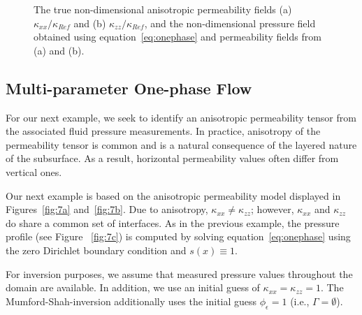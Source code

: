 \documentclass[manuscript,revised]{geophysics}
\begin{document}
{\begin{figure}
\caption{The true non-dimensional anisotropic permeability fields (a) $\kappa_{xx}/\kappa_{Ref}$ and (b) $\kappa_{zz}/\kappa_{Ref}$, and the non-dimensional pressure field obtained using equation~\ref{eq:onephase} and permeability fields from (a) and (b).}
\label{fig:7}
\end{figure}
}

\subsection{Multi-parameter One-phase Flow}
For our next example, we seek to identify an anisotropic permeability tensor from the associated fluid pressure measurements.  In practice, anisotropy of the permeability tensor is common and is a natural consequence of the layered nature of the subsurface.  As a result, horizontal permeability values often differ from vertical ones.

Our next example is based on the anisotropic permeability model displayed in Figures~\ref{fig:7a} and~\ref{fig:7b}.  Due to anisotropy, $\kappa_{xx} \neq \kappa_{zz}$; however, $\kappa_{xx}$ and $\kappa_{zz}$ do share a common set of interfaces.  As in the previous example, the pressure profile (see Figure ~\ref{fig:7c}) is  computed by solving equation~\ref{eq:onephase} using the zero Dirichlet boundary condition and $s(x) \equiv 1$.  

For inversion purposes, we assume that measured pressure values throughout the domain are available.  In addition, we use an initial guess of $\kappa_{xx}=\kappa_{zz}=1$.  The Mumford-Shah-inversion additionally uses the initial guess $\phi_\epsilon=1$ (i.e., $\Gamma=\emptyset$).
\end{document}
